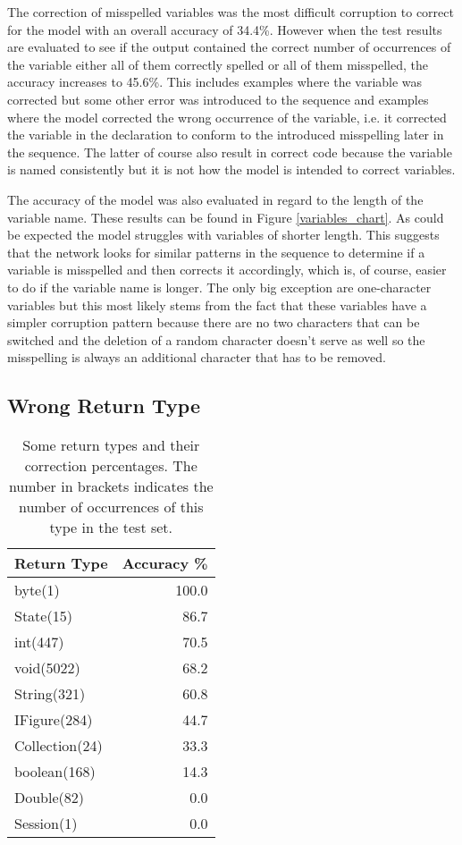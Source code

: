 The correction of misspelled variables was the most difficult corruption to correct for the model with an overall accuracy of 34.4\%. However when the test results are evaluated to see if the output contained the correct number of occurrences of the variable either all of them correctly spelled or all of them misspelled, the accuracy increases to 45.6\%. This includes examples where the variable was corrected but some other error was introduced to the sequence and examples where the model corrected the wrong occurrence of the variable, i.e. it corrected the variable in the declaration to conform to the introduced misspelling later in the sequence. The latter of course also result in correct code because the variable is named consistently but it is not how the model is intended to correct variables.

The accuracy of the model was also evaluated in regard to the length of the variable name. These results can be found in Figure \ref{variables_chart}. As could be expected the model struggles with variables of shorter length. This suggests that the network looks for similar patterns in the sequence to determine if a variable is misspelled and then corrects it accordingly, which is, of course, easier to do if the variable name is longer. The only big exception are one-character variables but this most likely stems from the fact that these variables have a simpler corruption pattern because there are no two characters that can be switched and the deletion of a random character doesn't serve as well so the misspelling is always an additional character that has to be removed.

\subsection{Wrong Return Type}

\begin{table}[t]
\centering
\begin{tabular}{ | l | r | }
  \hline
  Return Type & Accuracy \% \\
  \hline
  \hline
  byte(1) & 100.0 \\
  \hline
  State(15) & 86.7 \\
  \hline
  int(447) & 70.5 \\
  \hline
  void(5022) & 68.2 \\
  \hline
  String(321) & 60.8 \\
  \hline
  IFigure(284) & 44.7 \\
  \hline
  Collection(24) & 33.3 \\
  \hline
  boolean(168) & 14.3 \\
  \hline
  Double(82) & 0.0 \\
  \hline
  Session(1) & 0.0 \\
  \hline
\end{tabular}
\caption{Some return types and their correction percentages. The number in brackets indicates the number of occurrences of this type in the test set.}
\label{return_type_selection_table}
\end{table}

